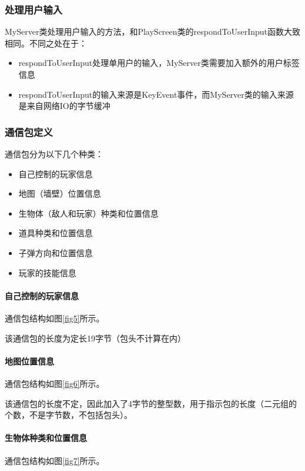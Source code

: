\documentclass{SCIS2022cn}
\begin{document}
\subsubsection{处理用户输入}
MyServer类处理用户输入的方法，和PlayScreen类的respondToUserInput函数大致相同。不同之处在于：
\begin{itemize}
    \item respondToUserInput处理单用户的输入，MyServer类需要加入额外的用户标签信息
    \item respondToUserInput的输入来源是KeyEvent事件，而MyServer类的输入来源是来自网络IO的字节缓冲
\end{itemize}

\subsubsection{通信包定义}

通信包分为以下几个种类：
\begin{itemize}
    \item 自己控制的玩家信息
    \item 地图（墙壁）位置信息
    \item 生物体（敌人和玩家）种类和位置信息
    \item 道具种类和位置信息
    \item 子弹方向和位置信息
    \item 玩家的技能信息
\end{itemize}

\paragraph{自己控制的玩家信息}

通信包结构如图\ref{fig5}所示。

该通信包的长度为定长19字节（包头不计算在内）

\paragraph{地图位置信息}
通信包结构如图\ref{fig6}所示。

该通信包的长度不定，因此加入了4字节的整型数，用于指示包的长度（二元组的个数，不是字节数，不包括包头）。

\paragraph{生物体种类和位置信息}

通信包结构如图\ref{fig7}所示。
\end{document}
